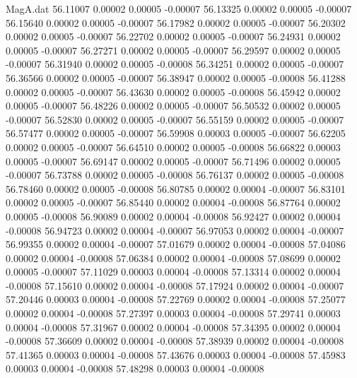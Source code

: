 \begin{filecontents}{MagA.dat}
  56.11007    0.00002    0.00005   -0.00007
  56.13325    0.00002    0.00005   -0.00007
  56.15640    0.00002    0.00005   -0.00007
  56.17982    0.00002    0.00005   -0.00007
  56.20302    0.00002    0.00005   -0.00007
  56.22702    0.00002    0.00005   -0.00007
  56.24931    0.00002    0.00005   -0.00007
  56.27271    0.00002    0.00005   -0.00007
  56.29597    0.00002    0.00005   -0.00007
  56.31940    0.00002    0.00005   -0.00008
  56.34251    0.00002    0.00005   -0.00007
  56.36566    0.00002    0.00005   -0.00007
  56.38947    0.00002    0.00005   -0.00008
  56.41288    0.00002    0.00005   -0.00007
  56.43630    0.00002    0.00005   -0.00008
  56.45942    0.00002    0.00005   -0.00007
  56.48226    0.00002    0.00005   -0.00007
  56.50532    0.00002    0.00005   -0.00007
  56.52830    0.00002    0.00005   -0.00007
  56.55159    0.00002    0.00005   -0.00007
  56.57477    0.00002    0.00005   -0.00007
  56.59908    0.00003    0.00005   -0.00007
  56.62205    0.00002    0.00005   -0.00007
  56.64510    0.00002    0.00005   -0.00008
  56.66822    0.00003    0.00005   -0.00007
  56.69147    0.00002    0.00005   -0.00007
  56.71496    0.00002    0.00005   -0.00007
  56.73788    0.00002    0.00005   -0.00008
  56.76137    0.00002    0.00005   -0.00008
  56.78460    0.00002    0.00005   -0.00008
  56.80785    0.00002    0.00004   -0.00007
  56.83101    0.00002    0.00005   -0.00007
  56.85440    0.00002    0.00004   -0.00008
  56.87764    0.00002    0.00005   -0.00008
  56.90089    0.00002    0.00004   -0.00008
  56.92427    0.00002    0.00004   -0.00008
  56.94723    0.00002    0.00004   -0.00007
  56.97053    0.00002    0.00004   -0.00007
  56.99355    0.00002    0.00004   -0.00007
  57.01679    0.00002    0.00004   -0.00008
  57.04086    0.00002    0.00004   -0.00008
  57.06384    0.00002    0.00004   -0.00008
  57.08699    0.00002    0.00005   -0.00007
  57.11029    0.00003    0.00004   -0.00008
  57.13314    0.00002    0.00004   -0.00008
  57.15610    0.00002    0.00004   -0.00008
  57.17924    0.00002    0.00004   -0.00007
  57.20446    0.00003    0.00004   -0.00008
  57.22769    0.00002    0.00004   -0.00008
  57.25077    0.00002    0.00004   -0.00008
  57.27397    0.00003    0.00004   -0.00008
  57.29741    0.00003    0.00004   -0.00008
  57.31967    0.00002    0.00004   -0.00008
  57.34395    0.00002    0.00004   -0.00008
  57.36609    0.00002    0.00004   -0.00008
  57.38939    0.00002    0.00004   -0.00008
  57.41365    0.00003    0.00004   -0.00008
  57.43676    0.00003    0.00004   -0.00008
  57.45983    0.00003    0.00004   -0.00008
  57.48298    0.00003    0.00004   -0.00008

\end{filecontents}
